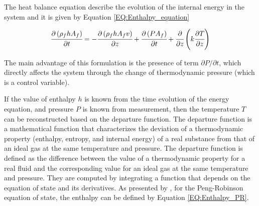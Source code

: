 \documentclass[../Article_Model_Parameters.tex]{subfiles}
\begin{document}

		
			The heat balance equation describe the evolution of the internal energy in the system and it is given by Equation \ref{EQ:Enthalpy_equation}
			
			{\footnotesize
				\begin{equation} \label{EQ:Enthalpy_equation}
					\cfrac{\partial \left(\rho_f {\color{black}h} A_f\right)}{\partial t} = - \cfrac{\partial \left( \rho_f {\color{black}h} A_f v \right)}{\partial z} + \cfrac{\partial \left(P A_f\right)}{\partial t} + \cfrac{\partial}{\partial z} \left( k \cfrac{\partial T}{\partial z} \right)
				\end{equation}
			}
		
			The main advantage of this formulation is the presence of term $\partial P / \partial t $, which directly affects the system through the change of thermodynamic pressure (which is a control variable). %
			
			If the value of enthalpy $h$ is known from the time evolution of the energy equation, and pressure $P$ is known from measurement, then the temperature $T$ can be reconstructed based on the departure function. The departure function is a mathematical function that characterizes the deviation of a thermodynamic property (enthalpy, entropy, and internal energy) of a real substance from that of an ideal gas at the same temperature and pressure. The departure function is defined as the difference between the value of a thermodynamic property for a real fluid and the corresponding value for an ideal gas at the same temperature and pressure. They are computed by integrating a function that depends on the equation of state and its derivatives. As presented by \citet{Gmehling2019}, for the Peng-Robinson equation of state, the enthalpy can be defined by Equation \ref{EQ:Enthalpy_PR}.
			
\end{document}
